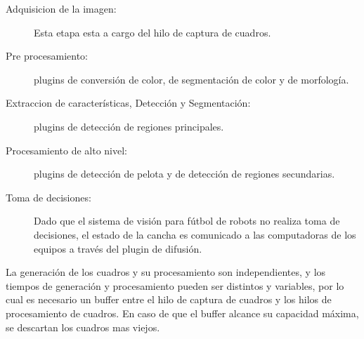 \begin{description}

\item[Adquisicion de la imagen:] Esta etapa esta a cargo del hilo de captura de
	cuadros.

\item[Pre procesamiento:] plugins de conversión de color, de segmentación de
	color y de morfología.

\item[Extraccion de características, Detección y Segmentación:] plugins de
	detección de regiones principales.

\item[Procesamiento de alto nivel:] plugins de detección de pelota y de
	detección de regiones secundarias.

\item[Toma de decisiones:] Dado que el sistema de visión para fútbol de robots
	no realiza toma de decisiones, el estado de la cancha es comunicado a
	las computadoras de los equipos a través del plugin de difusión.

\end{description}

La generación de los cuadros y su procesamiento son independientes, y los
tiempos de generación y procesamiento pueden ser distintos y variables, por lo
cual es necesario un buffer entre el hilo de captura de cuadros y los hilos de
procesamiento de cuadros. En caso de que el buffer alcance su capacidad máxima,
se descartan los cuadros mas viejos.
